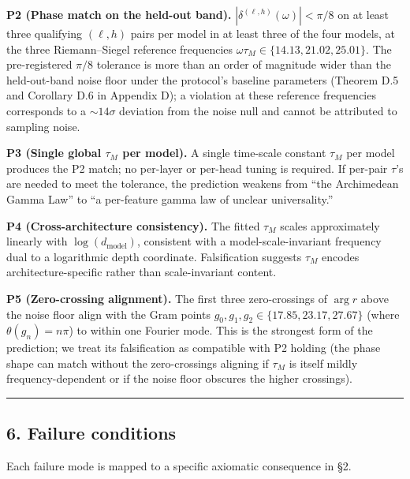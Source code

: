 \documentclass[
  letterpaper,
  11pt]{article}
\theoremstyle{plain}
\theoremstyle{definition}
\theoremstyle{remark}
\begin{document}
\textbf{P2 (Phase match on the held-out band).} \(|\delta^{(\ell, h)}(\omega)| < \pi/8\) on at least three qualifying \((\ell, h)\) pairs per model in at least three of the four models, at the three Riemann--Siegel reference frequencies \(\omega\tau_M \in \{14.13, 21.02, 25.01\}\). The pre-registered \(\pi/8\) tolerance is more than an order of magnitude wider than the held-out-band noise floor under the protocol's baseline parameters (Theorem D.5 and Corollary D.6 in Appendix D); a violation at these reference frequencies corresponds to a \(\sim 14\sigma\) deviation from the noise null and cannot be attributed to sampling noise.

\textbf{P3 (Single global \(\tau_M\) per model).} A single time-scale constant \(\tau_M\) per model produces the P2 match; no per-layer or per-head tuning is required. If per-pair \(\tau\)'s are needed to meet the tolerance, the prediction weakens from ``the Archimedean Gamma Law'' to ``a per-feature gamma law of unclear universality.''

\textbf{P4 (Cross-architecture consistency).} The fitted \(\tau_M\) scales approximately linearly with \(\log(d_\text{model})\), consistent with a model-scale-invariant frequency dual to a logarithmic depth coordinate. Falsification suggests \(\tau_M\) encodes architecture-specific rather than scale-invariant content.

\textbf{P5 (Zero-crossing alignment).} The first three zero-crossings of \(\arg r\) above the noise floor align with the Gram points \(g_0, g_1, g_2 \in \{17.85, 23.17, 27.67\}\) (where \(\theta(g_n) = n\pi\)) to within one Fourier mode. This is the strongest form of the prediction; we treat its falsification as compatible with P2 holding (the phase shape can match without the zero-crossings aligning if \(\tau_M\) is itself mildly frequency-dependent or if the noise floor obscures the higher crossings).

\begin{center}\rule{0.5\linewidth}{0.5pt}\end{center}

\subsection{6. Failure conditions}\label{failure-conditions}

Each failure mode is mapped to a specific axiomatic consequence in §2.
\end{document}
